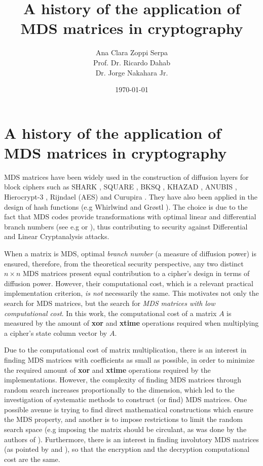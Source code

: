 \documentclass{report}
\title{A history of the application of MDS matrices in cryptography}
\author{Ana Clara Zoppi Serpa\\ Prof. Dr. Ricardo Dahab \\ Dr. Jorge Nakahara Jr.}
\date{\today}
\begin{document}

\maketitle

\tableofcontents

\chapter{A history of the application of MDS matrices in cryptography}

MDS matrices have been widely used in the construction of diffusion layers for block ciphers such as SHARK \cite{SHARK1996}, SQUARE \cite{SQUARE1997}, BKSQ \cite{BKSQ1998}, KHAZAD \cite{KHAZAD2000}, ANUBIS \cite{ANUBIS2000}, Hierocrypt-3 \cite{Hierocrypt2000}, Rijndael (AES) \cite{DesignOfRijndael2002} and Curupira \cite{barreto2007curupira}. They have also been applied in the design of hash functions (e.g Whirlwind \cite{Whirlwind2010} and Gr{\o}stl \cite{Grostl2009}). The choice is due to the fact that MDS codes provide transformations with optimal linear and differential branch numbers (see e.g \cite{SQUARE1997} or \cite{SHARK1996}), thus contributing to security against Differential and Linear Cryptanalysis attacks. 

When a matrix is MDS, optimal \emph{branch number} (a measure of diffusion power) is ensured, therefore, from the theoretical security perspective, any two distinct $n \times n$ MDS matrices present equal contribution to a cipher's design in terms of diffusion power. However, their computational cost, which is a relevant practical implementation criterion, \emph{is not} necessarily the same. This motivates not only the search for MDS matrices, but the search for \emph{MDS matrices with low computational cost}. In this work, the computational cost of a matrix $A$ is measured by the amount of \textbf{xor} and \textbf{xtime} operations required when multiplying a cipher's state column vector by $A$.

Due to the computational cost of matrix multiplication, there is an interest in finding MDS matrices with coefficients as small as possible, in order to minimize the required amount of \textbf{xor} and \textbf{xtime} operations required by the implementations. However, the complexity of finding MDS matrices through random search increases proportionally to the dimension, which led to the investigation of systematic methods to construct (or find) MDS matrices. One possible avenue is trying to find direct mathematical constructions which ensure the MDS property, and another is to impose restrictions to limit the random search space (e.g imposing the matrix should be circulant, as was done by the authors of \cite{SQUARE1997}). Furthermore, there is an interest in finding involutory MDS matrices (as pointed by \cite{KHAZAD2000} and \cite{ANUBIS2000}), so that the encryption and the decryption computational cost are the same.
\end{document}
